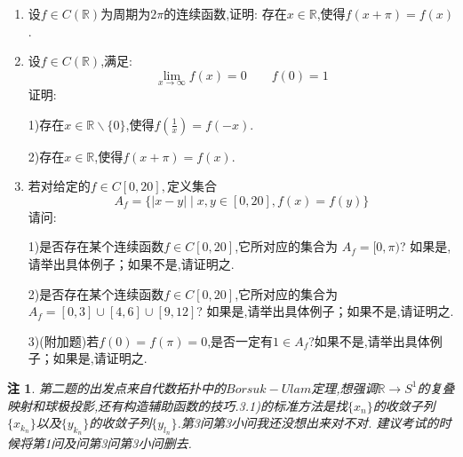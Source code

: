 \documentclass{ctexart}
\newtheorem{re}{注}
\begin{document}
\begin{enumerate}
	
	\item

设$f \in C(\mathbb{R})$为周期为$2 \pi$的连续函数,证明:
存在$x \in \mathbb{R}$,使得$f(x+ \pi)=f(x)$.
	
		\item
	
设$f \in C(\mathbb{R})$,满足:
$$\lim\limits_{x \rightarrow \infty}f(x)= 0 \qquad f(0)= 1 $$
证明:
	
	1)存在$x \in \mathbb{R} \smallsetminus
	 \{0\}$,使得$f(\frac{1}{x})=f(-x)$.
	
	2)存在$x \in \mathbb{R}$,使得$f(x+ \pi)=f(x)$.
	
			\item
	
	若对给定的$f \in C[0,20],$定义集合
	$$A_f=\{|x-y| \mid x,y \in [0,20], f(x)=f(y)\}$$
	请问:
	
	1)是否存在某个连续函数$f \in C[0,20]$,它所对应的集合为
	$A_f=[0,\pi)$?
	如果是,请举出具体例子；如果不是,请证明之.
	
	2)是否存在某个连续函数$f \in C[0,20]$,它所对应的集合为
	$A_f=[0,3] \cup [4,6] \cup [9,12]$?
	如果是,请举出具体例子；如果不是,请证明之.
	
	3)(附加题)若$f(0)=f(\pi)=0$,是否一定有$1 \in A_f$?如果不是,请举出具体例子；如果是,请证明之.
\end{enumerate}
\begin{re}
	第二题的出发点来自代数拓扑中的$Borsuk-Ulam$定理,想强调$\mathbb{R}\rightarrow S^1$的复叠映射和球极投影,还有构造辅助函数的技巧.3.1)的标准方法是找$\{x_n\}$的收敛子列$\{x_{k_n}\}$以及$\{y_{k_n}\}$的收敛子列$\{y_{l_n}\}$.第3问第3小问我还没想出来对不对.
	建议考试的时候将第1问及问第3问第3小问删去.
\end{re}
\end{document}

